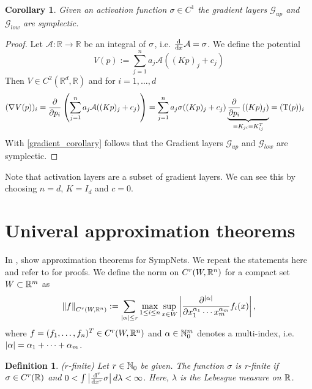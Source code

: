 \documentclass[twoside,a4paper]{article}
\newtheorem{definition}{Definition}
\newtheorem{corollary}{Corollary}
\begin{document}
\begin{corollary}
	Given an activation function $\sigma \in C^1$ the gradient layers $\mathcal{G}_{up}$
	and $\mathcal{G}_{low}$ are symplectic.
\end{corollary}
\begin{proof}
	Let $\mathcal{A}: \mathbb{R} \to \mathbb{R}$ be an integral of $\sigma$, 
	i.e. $\frac{\mathrm{d}^{}}{\mathrm{d}x} \mathcal{A} = \sigma$. We define the potential
	\begin{equation*}
		V(p) := \sum_{j=1}^n a_j \mathcal{A}((Kp)_j + c_j)
	\end{equation*}
	Then $V \in C^2(\mathbb{R}^d, \mathbb{R})$ and for $i=1, \dots, d$
	\begin{align*}
		(\nabla_{}{V(p)})_i &= \frac{\partial }{\partial p_i} \left( \sum_{j=1}^n a_j \mathcal{A}((Kp)_j + c_j) \right)
		= \sum_{j=1}^n a_j \sigma((Kp)_j + c_j) 
		\underbrace{\frac{\partial }{\partial p_i} \left( (Kp)_j \right)}_{=K_{ji} = K^T_{ij}}
		= (\mathrm{T}(p))_i
	\end{align*}
	With \cref{gradient_corollary} follows that the Gradient layers
	$\mathcal{G}_{up}$ and $\mathcal{G}_{low}$ are symplectic.
\end{proof}

Note that activation layers are a subset of gradient layers. We can see this by choosing
$n=d$, $K=I_d$ and $c=0$.

\section{Univeral approximation theorems}\label{sec_unv_approx_theorem}

In \cite{Jin2020}, \citeauthor{Jin2020} show approximation theorems for SympNets.
We repeat the statements here and refer to \cite{Jin2020} for proofs.
We define the norm on $C^r(W, \mathbb{R}^n)$ for a compact set $W \subset \mathbb{R}^m$ as
\begin{equation*}
	\left\lVert{f}\right\rVert_{C^r(W,\mathbb{R}^n)} := \sum_{\left|{\alpha}\right| \leq r}
	\max_{1 \leq i \leq n} \sup_{x \in W}
	\left|{\frac{\partial^{\left|{\alpha}\right|}}{\partial x_1^{\alpha_1} \cdots x_m^{\alpha_m}} 
	f_i(x)}\right|
	,
\end{equation*}
where $f = (f_1, \dots, f_n)^T \in C^r(W,\mathbb{R}^n)$ and $\alpha \in \mathbb{N}_0^m$ denotes a multi-index, i.e. 
$\left|{\alpha}\right| = \alpha_1 + \cdots + \alpha_m$.

\begin{definition}
	($r$-finite)
	Let $r \in \mathbb{N}_0$ be given. The function $\sigma$ is r-finite if $\sigma \in C^r(\mathbb{R})$
	and $0 < \int \left|{\frac{\mathrm{d}^r}{\mathrm{d}x^r} \sigma}\right| d\lambda < \infty$. Here,
	$\lambda$ is the Lebesgue measure on $\mathbb{R}$.
\end{definition}
\end{document}
